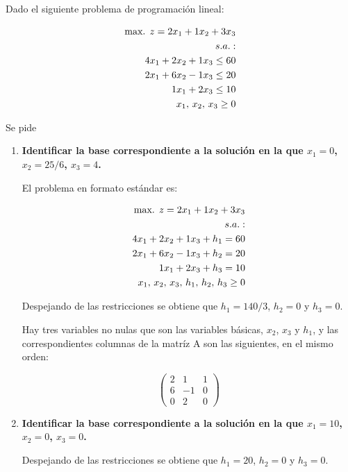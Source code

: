 Dado el siguiente problema de programación lineal:

\begin{equation}
\begin{split}
\mbox {max. }z=2x_1+1x_2+3x_3\\
s.a.:\\
4x_1+2x_2+1x_3 \leq 60\\
2x_1+6x_2 -1x_3 \leq 20\\
1x_1+2x_3 \leq 10\\
x_1,\,x_2,\,x_3 \geq 0
\notag
\end{split}
\end{equation}

Se pide
\begin{enumerate}
    \item \textbf{Identificar la base correspondiente a la solución  en la que $x_1=0$, $x_2=25/6$, $x_3=4$.}

    El problema en formato estándar es:
    
    \begin{equation}
    \begin{split}
    \mbox {max. }z=2x_1+1x_2+3x_3\\
    s.a.:\\
    4x_1+2x_2+1x_3 + h_1 = 60\\
    2x_1+6x_2 -1x_3 + h_2 = 20\\
    1x_1+2x_3 + h_3 = 10\\
    x_1,\,x_2,\,x_3,\,h_1,\,h_2,\,h_3 \geq 0
    \notag
    \end{split}
    \end{equation}

    Despejando de las restricciones se obtiene que $h_1=140/3$, $h_2=0$ y $h_3=0$.

    Hay tres variables no nulas que son las variables básicas, $x_2$, $x_3$ y $h_1$, y las correspondientes columnas de la matríz A son las siguientes, en el mismo orden:

    \[
    \begin{pmatrix}
       2 &  1 &  1\\
       6 & -1 &  0\\
       0 &  2 &  0
    \end{pmatrix} 
    \]
    
    \item \textbf{Identificar la base correspondiente a la solución  en la que $x_1=10$, $x_2=0$, $x_3=0$.}

    Despejando de las restricciones se obtiene que $h_1=20$, $h_2=0$ y $h_3=0$.


\end{enumerate}
